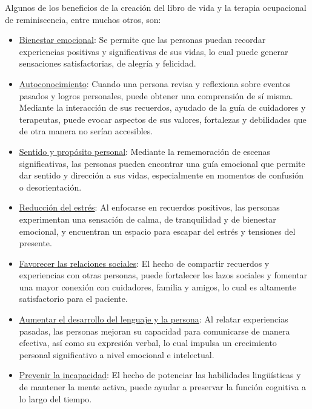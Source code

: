 
Algunos de los beneficios de la creación del libro de vida y la terapia ocupacional de reminiscencia, entre muchos otros, son:\\
\begin{itemize}
	\item \underline{Bienestar emocional}: Se permite que las personas puedan recordar experiencias positivas y significativas de sus vidas, lo cual puede generar sensaciones satisfactorias, de alegría y felicidad.\\
	\item \underline{Autoconocimiento}: Cuando una persona revisa y reflexiona sobre eventos pasados y logros personales, puede obtener una comprensión de sí misma. Mediante la interacción de sus recuerdos, ayudado de la guía de cuidadores y terapeutas, puede evocar aspectos de sus valores, fortalezas y debilidades que de otra manera no serían accesibles.
	\item \underline{Sentido y propósito personal}: Mediante la rememoración de escenas significativas, las personas pueden encontrar una guía emocional que permite dar sentido y dirección a sus vidas, especialmente en momentos de confusión o desorientación.
	\item \underline{Reducción del estrés}: Al enfocarse en recuerdos positivos, las personas experimentan una sensación de calma, de tranquilidad y de bienestar emocional, y encuentran un espacio para escapar del estrés y tensiones del presente.
	\item \underline{Favorecer las relaciones sociales}: El hecho de compartir recuerdos y experiencias con otras personas, puede fortalecer los lazos sociales y fomentar una mayor conexión con cuidadores, familia y amigos, lo cual es altamente satisfactorio para el paciente.
	\item \underline{Aumentar el desarrollo del lenguaje y la persona}: Al relatar experiencias pasadas, las personas mejoran su capacidad para comunicarse de manera efectiva, así como su expresión verbal, lo cual impulsa un crecimiento personal significativo a nivel emocional e intelectual.
	\item \underline{Prevenir la incapacidad}: El hecho de potenciar las habilidades lingüísticas y de mantener la mente activa, puede ayudar a preservar la función cognitiva a lo largo del tiempo. 
	\end{itemize}




